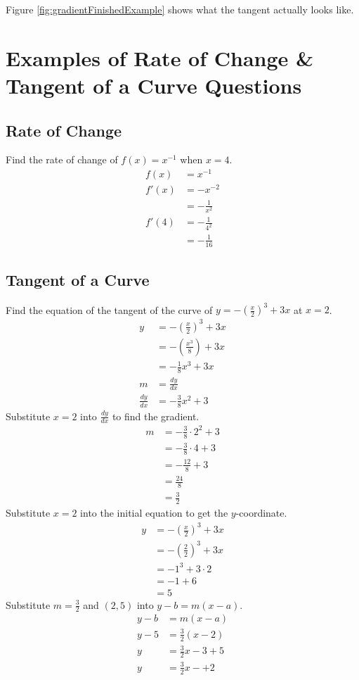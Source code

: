 Figure \ref{fig:gradientFinishedExample} shows what the tangent actually looks like.


\section{Examples of Rate of Change \& Tangent of a Curve Questions}
\label{sec:derivativeExamples}
\subsection{Rate of Change}
Find the rate of change of $f(x) = x^{-1}$ when $x=4$.
\begin{align*}
	f(x) &= x^{-1}\\
	f'(x) &= -x^{-2}\\
	&= -\frac{1}{x^2}\\
	f'(4) &= -\frac{1}{4^2}\\
	&= -\frac{1}{16}
\end{align*}

\subsection{Tangent of a Curve}
Find the equation of the tangent of the curve of $y=-\left(\frac{x}{2}\right)^3+3x$ at $x=2$.
\begin{align*}
	y &= -\left(\frac{x}{2}\right)^3+3x\\
	&= -\left(\frac{x^3}{8}\right)+3x\\
	&= -\frac{1}{8}x^3+3x\\[1.5em]
	m&=\frac{dy}{dx}\\
	\frac{dy}{dx} &= -\frac{3}{8}x^2+3
\end{align*}
Substitute $x=2$ into $\frac{dy}{dx}$ to find the gradient.
\begin{align*}
	m &= -\frac{3}{8} \cdot 2^2+3\\
	&=-\frac{3}{8} \cdot 4 + 3\\
	&=-\frac{12}{8} + 3\\
	&=\frac{24}{8}\\
	&=\frac{3}{2}
\end{align*}
Substitute $x=2$ into the initial equation to get the $y$-coordinate.
\begin{align*}
	y&=-\left(\frac{x}{2}\right)^3+3x\\
	&=-\left(\frac{2}{2}\right)^3+3x\\
	&=-1^3 + 3 \cdot 2\\
	&=-1 + 6\\
	&=5
\end{align*}
Substitute $m=\frac{3}{2}$ and $(2,5)$ into $y-b=m(x-a)$.
\begin{align*}
	y-b&=m(x-a)\\
	y-5&=\frac{3}{2}\left(x-2\right)\\
	y&=\frac{3}{2}x-3+5\\
	y&=\frac{3}{2}x-+2
\end{align*}


